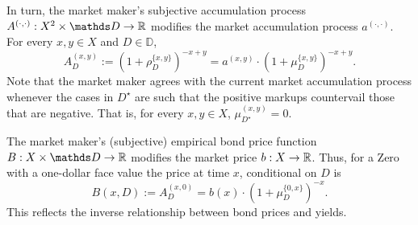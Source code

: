 \documentclass[12pt,a4paper,twoside]{article}
\newcommand{\mbbd}{{\mathds D}}
\newcommand{\past}{{D^\star}}
\newcommand{\xy}{{(x, y)}}
\newcommand{\dd}{{(\cdot,\cdot)}}
\begin{document}
In turn, the market maker's subjective accumulation process ${A^{\dd}}: X^2
\times \mbbd \rightarrow \R$ modifies the market accumulation process
$a^{\dd}$. For every $x, y \in X$ and $D \in\mbbd$,
\begin{equation*}
  {A}^{\xy}_{D} := \left(1 + \rho^{\{x,y\}}_{D}\right)^{-x + y} = a^{\xy} \cdot
  \left(1 + \mu^{\{x, y\}}_{D}\right)^{-x + y}.
\end{equation*}
Note that the market maker agrees with the current market accumulation process
whenever the cases in $\past$ are such that the positive markups countervail
those that are negative. That is, for every $x, y \in X$, ${\mu}^{\xy}_{\past}
= 0$.

The market maker's (subjective) empirical bond price function $B : X \times
\mbbd \rightarrow \R$ modifies the market price $b: X \rightarrow \mathbb R$. Thus,
for a Zero with a one-dollar face value the price at time $x$, conditional on
$D$ is 
\begin{equation*} B(x,D) := {A}^{(x, 0)}_{D} =
  b(x) \cdot \left( 1 + \mu^{\{0,x\}}_{D} \right)^{-x} .
\end{equation*}
This reflects the inverse relationship between bond prices and yields.  
\end{document}
